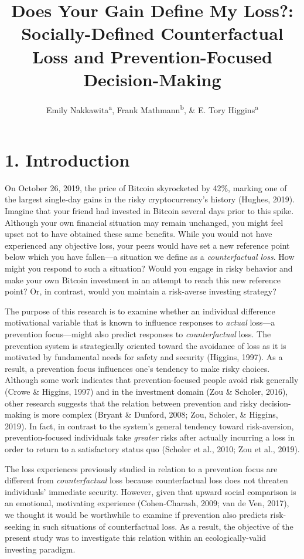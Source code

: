 \documentclass[man,floatsintext]{apa6}
\title{Does Your Gain Define My Loss?: Socially-Defined Counterfactual Loss and Prevention-Focused Decision-Making}
\author{Emily Nakkawita\textsuperscript{a}, Frank Mathmann\textsuperscript{b}, \& E. Tory Higgins\textsuperscript{a}}
\date{}
\affiliation{
\vspace{0.5cm}
\textsuperscript{a} Columbia University\\\textsuperscript{b} Queensland University of Technology}
\begin{document}
\maketitle

\hypertarget{introduction}{%
\section{1. Introduction}\label{introduction}}

On October 26, 2019, the price of Bitcoin skyrocketed by 42\%, marking one of the largest single-day gains in the risky cryptocurrency's history (Hughes, 2019). Imagine that your friend had invested in Bitcoin several days prior to this spike. Although your own financial situation may remain unchanged, you might feel upset not to have obtained these same benefits. While you would not have experienced any objective loss, your peers would have set a new reference point below which you have fallen---a situation we define as a \emph{counterfactual loss}. How might you respond to such a situation? Would you engage in risky behavior and make your own Bitcoin investment in an attempt to reach this new reference point? Or, in contrast, would you maintain a risk-averse investing strategy?

The purpose of this research is to examine whether an individual difference motivational variable that is known to influence responses to \emph{actual} loss---a prevention focus---might also predict responses to \emph{counterfactual} loss. The prevention system is strategically oriented toward the avoidance of loss as it is motivated by fundamental needs for safety and security (Higgins, 1997). As a result, a prevention focus influences one's tendency to make risky choices. Although some work indicates that prevention-focused people avoid risk generally (Crowe \& Higgins, 1997) and in the investment domain (Zou \& Scholer, 2016), other research suggests that the relation between prevention and risky decision-making is more complex (Bryant \& Dunford, 2008; Zou, Scholer, \& Higgins, 2019). In fact, in contrast to the system's general tendency toward risk-aversion, prevention-focused individuals take \emph{greater} risks after actually incurring a loss in order to return to a satisfactory status quo (Scholer et al., 2010; Zou et al., 2019).

The loss experiences previously studied in relation to a prevention focus are different from \emph{counterfactual} loss because counterfactual loss does not threaten individuals' immediate security. However, given that upward social comparison is an emotional, motivating experience (Cohen‐Charash, 2009; van de Ven, 2017), we thought it would be worthwhile to examine if prevention also predicts risk-seeking in such situations of counterfactual loss. As a result, the objective of the present study was to investigate this relation within an ecologically-valid investing paradigm.
\end{document}
